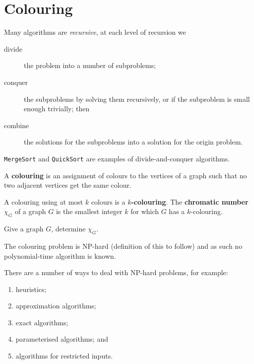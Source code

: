 \chapter{Colouring}

Many algorithms are \emph{recursive}, at each level of recursion we
\begin{description}
    \item[divide] the problem into a number of subproblems;
    \item[conquer] the subproblems by solving them recursively, or
        if the subproblem is small enough trivially; then
    \item[combine] the solutions for the subproblems into a solution
        for the origin problem.
\end{description}

\begin{example}
    \texttt{MergeSort} and \texttt{QuickSort} are examples
    of divide-and-conquer algorithms.
\end{example}

\begin{definition}[Colouring]
    A \textbf{colouring} is an assignment of colours to the vertices of a graph
    such that no two adjacent vertices get the same colour.
\end{definition}

A colouring using at most $k$ colours is a \textbf{$k$-colouring}.
The \textbf{chromatic number} $\chi_G$ of a graph $G$
is the smallest integer $k$ for which $G$ has a $k$-colouring.

\begin{problem}[Colouring]
    Give a graph $G$, determine $\chi_G$.
\end{problem}

The colouring problem is NP-hard (definition of this to follow)
and as such no polynomial-time algorithm is known.

There are a number of ways to deal with NP-hard problems, for example:
\begin{enumerate}
    \item heuristics;
    \item approximation algorithms;
    \item exact algorithms;
    \item parameterised algorithms; and
    \item algorithms for restricted inputs.
\end{enumerate}


